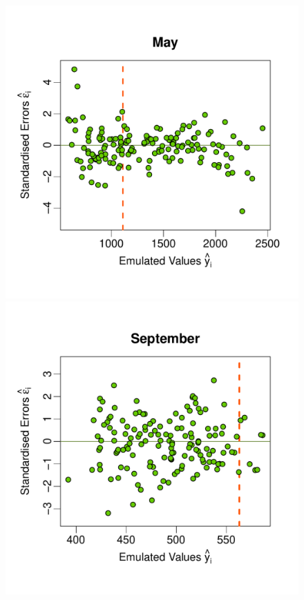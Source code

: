 \documentclass[a4paper, 12pt]{article}
\begin{document}
\begin{figure}
 \includegraphics[width=\scale]{Validation_Plots/Validation_Scatter_05_May}\hspace{-1ex}
 \includegraphics[width=\scale]{Validation_Plots/Validation_Scatter_09_Sep}\\[-3ex]

\end{figure}
\end{document}
